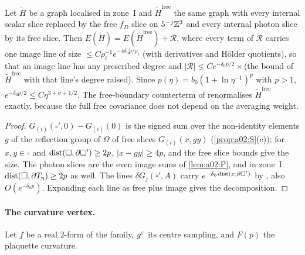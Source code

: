 \begin{lemma}\label{lem:a02:I}
Let $\tilde H$ be a graph localised in zone~I and $\tilde H^{\mathrm{free}}$ the same graph with every internal scalar slice replaced by the free $f_D$ slice on $5^{-j}\mathbb Z^3$ and every internal photon slice by its free slice. Then $E(\tilde H)=E(\tilde H^{\mathrm{free}})+\mathcal R$, where every term of $\mathcal R$ carries one image line of size $\le C\rho_i^{-1}e^{-4\delta_0p/\rho_i}$ (with derivatives and H\"older quotients), so that an image line has any prescribed degree and $|\mathcal R|\le Ce^{-\delta_0p/2}\times$(the bound of $\tilde H^{\mathrm{free}}$ with that line's degree raised). Since $p(\eta)=b_0(1+\ln\eta^{-1})^p$ with $p>1$, $e^{-\delta_0p/2}\le C\eta^{3+\sigma+1/2}$. The free-boundary counterterm of \cite[p.~330]{K2} renormalises $\tilde H^{\mathrm{free}}$ exactly, because the full free covariance does not depend on the averaging weight.
\end{lemma}
\begin{proof}
$G_{(i)}(\square',0)-G_{(i)}(0)$ is the signed sum over the non-identity elements $g$ of the reflection group of $\Omega$ of free slices $G_{(i)}(x,gy)$ (\cref{prop:a02:S}(c)); for $x,y\in\square$ and $\operatorname{dist}(\square,\partial\square')\ge2p$, $|x-gy|\ge4p$, and the free slice bounds give the size. The photon slices are the even image sums of \cref{lem:a02:P}, and in zone~I $\operatorname{dist}(\square,\partial T_\eta)\ge2p$ as well. The lines $\delta G_j(\square',A)$ carry $e^{-\delta_0\operatorname{dist}(x,\partial\square')}$ by \cite[(5.3)]{K2}, also $O(e^{-\delta_0p})$. Expanding each line as free plus image gives the decomposition.
\end{proof}

\paragraph{The curvature vertex.} Let $f$ be a real $2$-form of the family, $g^{\varepsilon}$ its centre sampling, and $F(p)$ the plaquette curvature.


